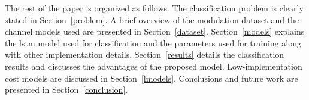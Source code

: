 The rest of the paper is organized as follows. The classification problem is clearly stated in Section~\ref{problem}. A brief overview of the modulation dataset and the channel models used are presented in Section~\ref{dataset}.  Section~\ref{models} explains the \ac{lstm} model used for classification and the parameters used for training along with other implementation details. Section~\ref{results} details the classification results and discusses the advantages of the proposed model. Low-implementation cost models are discussed in Section~\ref{lmodels}. Conclusions and future work are presented in Section~\ref{conclusion}.


